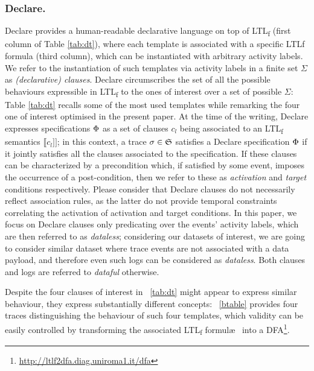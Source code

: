 \documentclass[sigconf]{acmart}
\newcommand{\rrbraket}{\ensuremath{]\!]}}
\begin{document}
\subsubsection{Declare.} Declare \cite{4384001,Li2020} provides a human-readable declarative language on top of LTL\textsubscript{f} (first column  of Table \ref{tab:dt}), where each template is associated with a specific LTL\textsf{f} formula (third column), which can be instantiated with arbitrary activity labels. We refer to the instantiation of such templates via activity labels in a finite set $\Sigma$ as \textit{(declarative) clauses}. Declare circumscribes the set of all the possible behaviours expressible in LTL\textsubscript{f} to the ones of interest over a set of possible  $\Sigma$: Table \ref{tab:dt} recalls some of the most used templates while remarking the four one of interest optimised in the present paper. At the time of the writing, Declare expresses specifications $\Phi$ as a set of clauses $c_l$ being associated to an LTL\textsubscript{f} semantics $\llbracket c_l\rrbraket$; in this context, a trace $\sigma\in\mathfrak{S}$ satisfies a Declare specification $\Phi$ if it jointly satisfies all the clauses associated to the specification. If these clauses can be characterized by a precondition which, if satisfied by some event, imposes the occurrence of a post-condition, then we refer to these as \textit{activation} and \textit{target} conditions respectively. Please consider that Declare clauses do not necessarily reflect association rules, as the latter do not provide temporal constraints correlating the activation of activation and target conditions. In this paper, we focus on Declare clauses only predicating over the events' activity labels, which are then referred to as \textit{dataless}; considering our datasets of interest, we are going to consider similar dataset where trace events are not associated with a data payload, and therefore even such logs can be considered as \textit{dataless}. Both clauses and logs are referred to \textit{dataful} otherwise. 

Despite the four clauses of interest in \tablename~\ref{tab:dt} might appear to express similar behaviour, they express substantially different concepts: \tablename~\ref{btable} provides four traces distinguishing the behaviour of such four templates, which validity can be easily controlled by transforming the associated LTL\textsubscript{f} formul\ae~ into a DFA\footnote{\url{http://ltlf2dfa.diag.uniroma1.it/dfa}}.
\end{document}
